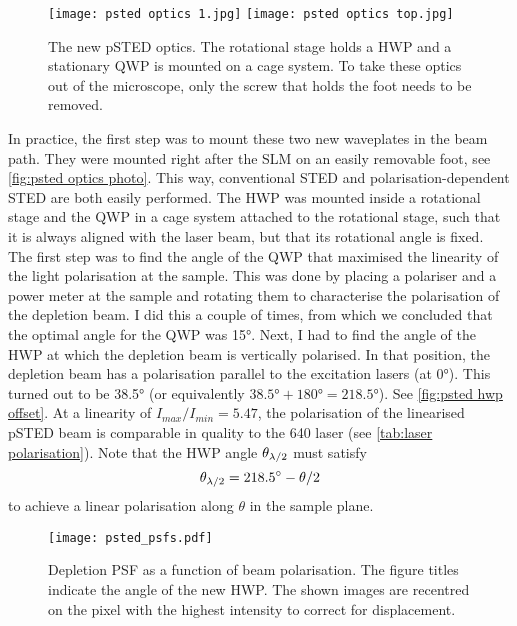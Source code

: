 \begin{figure}
	\centering
	\texttt{[image: psted optics 1.jpg]}%
	\hfill%
	\texttt{[image: psted optics top.jpg]}
	\caption{
		The new pSTED optics. The rotational stage holds a HWP and a stationary QWP is mounted on a cage system. To take these optics out of the microscope, only the screw that holds the foot needs to be removed.
	}
	\label{fig:psted optics photo}
\end{figure}

In practice, the first step was to mount these two new waveplates in the beam path. They were mounted right after the SLM on an easily removable foot, see \autoref{fig:psted optics photo}. This way, conventional STED and polarisation-dependent STED are both easily performed. The HWP was mounted inside a rotational stage and the QWP in a cage system attached to the rotational stage, such that it is always aligned with the laser beam, but that its rotational angle is fixed. The first step was to find the angle of the QWP that maximised the linearity of the light polarisation at the sample. This was done by placing a polariser and a power meter at the sample and rotating them to characterise the polarisation of the depletion beam. I did this a couple of times, from which we concluded that the optimal angle for the QWP was \ang{15}. Next, I had to find the angle of the HWP at which the depletion beam is vertically polarised. In that position, the depletion beam has a polarisation parallel to the excitation lasers (at \ang{0}). This turned out to be \ang{38.5} (or equivalently $\ang{38.5}+\ang{180}=\ang{218.5}$). See \autoref{fig:psted hwp offset}. At a linearity of $ I_{max}/I_{min} = 5.47 $, the polarisation of the linearised pSTED beam is comparable in quality to the 640 laser (see \autoref{tab:laser polarisation}). Note that the HWP angle $ \theta_{\lambda/2} $ must satisfy
\begin{equation}
	\theta_{\lambda/2} = \ang{218.5} - \theta/2
\end{equation} 
to achieve a linear polarisation along $ \theta $ in the sample plane.

\begin{figure}
	\centering
	\texttt{[image: psted\_psfs.pdf]}
	\caption{
		Depletion PSF as a function of beam polarisation. The figure titles indicate the angle of the new HWP. The shown images are recentred on the pixel with the highest intensity to correct for displacement.
	}
	\label{fig:psted psfs}
\end{figure}

